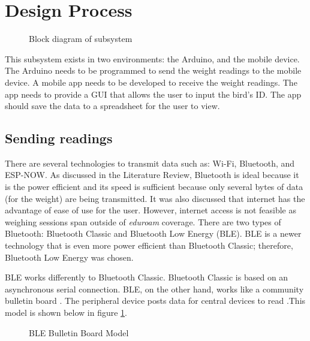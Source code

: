 \documentclass[class=report,11pt,crop=false]{standalone}
\begin{document}
			
		
	
		
	
	\section{Design Process}
		
		\begin{figure}[h!]
			\centering
			\caption{Block diagram of subsystem}
		\end{figure}
		
		This subsystem exists in two environments: the Arduino, and the mobile device. The Arduino needs to be programmed to send the weight readings to the mobile device. A mobile app needs to be developed to receive the weight readings. The app needs to provide a GUI that allows the user to input the bird's ID. The app should save the data to a spreadsheet for the user to view.
		
		\subsection{Sending readings}
		There are several technologies to transmit data such as: Wi-Fi, Bluetooth, and ESP-NOW. 
		As discussed in the Literature Review, Bluetooth is ideal because it is the power efficient and its speed is sufficient because only several bytes of data (for the weight) are being transmitted.
		It was also discussed that internet has the advantage of ease of use for the user. However, internet access is not feasible as weighing sessions span outside of \textit{eduroam} coverage.
		There are two types of Bluetooth: Bluetooth Classic and Bluetooth Low Energy (BLE). BLE is a newer technology that is even more power efficient than Bluetooth Classic; therefore, Bluetooth Low Energy was chosen.
		
		BLE works differently to Bluetooth Classic. Bluetooth Classic is based on an asynchronous serial connection. BLE, on the other hand, works like a community bulletin board \cite{ble}. The peripheral device posts data for central devices to read \cite{ble}.This model is shown below in figure \ref{fig:ble-bulletin-board-model}.
		
		\begin{figure}[h!]
			\centering
			\caption{BLE Bulletin Board Model \cite{ble}}
			\label{fig:ble-bulletin-board-model}
		\end{figure}
		
\end{document}
